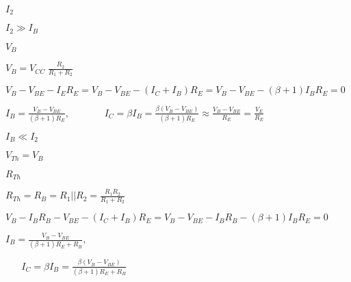 \documentclass{article}
\def\lthtmlcheckvsize{\ifdim\ht\sizebox<\vsize 
  \ifdim\wd\sizebox<\hsize\expandafter\hfill\fi \expandafter\vfill
  \else\expandafter\vss\fi}%
\begin{document}
{\newpage\clearpage
{}%
$ I_2$%
\lthtmlindisplaymathZ
\lthtmlcheckvsize\clearpage}

{\newpage\clearpage
{}%
$ I_2\gg I_B$%
\lthtmlindisplaymathZ
\lthtmlcheckvsize\clearpage}

{\newpage\clearpage
{}%
$ V_B$%
\lthtmlindisplaymathZ
\lthtmlcheckvsize\clearpage}

{\newpage\clearpage
{}%
$\displaystyle V_B = V_{CC} \;\frac{R_2}{R_1+R_2}$%
\lthtmlindisplaymathZ
\lthtmlcheckvsize\clearpage}

{\newpage\clearpage
{}%
$\displaystyle V_B-V_{BE}-I_ER_E=V_B-V_{BE}-(I_C+I_B)R_E=V_B-V_{BE}-(\beta+1)I_BR_E=0$%
\lthtmlindisplaymathZ
\lthtmlcheckvsize\clearpage}

{\newpage\clearpage
{}%
$\displaystyle I_B=\frac{V_B-V_{BE}}{(\beta+1)R_E},\;\;\;\;\;\;\;\;\;\;\;\;\;
I_C=\beta I_B=\frac{\beta(V_B-V_{BE})}{(\beta+1)R_E}
\approx \frac{V_B-V_{BE}}{R_E} =\frac{V_E}{R_E}$%
\lthtmlindisplaymathZ
\lthtmlcheckvsize\clearpage}

{\newpage\clearpage
{}%
$ I_B \ll I_2$%
\lthtmlindisplaymathZ
\lthtmlcheckvsize\clearpage}

{\newpage\clearpage
{}%
$ V_{Th}=V_B$%
\lthtmlindisplaymathZ
\lthtmlcheckvsize\clearpage}

{\newpage\clearpage
{}%
$ R_{Th}$%
\lthtmlindisplaymathZ
\lthtmlcheckvsize\clearpage}

{\newpage\clearpage
{}%
$\displaystyle R_{Th}=R_B=R_1||R_2=\frac{R_1R_2}{R_1+R_2}$%
\lthtmlindisplaymathZ
\lthtmlcheckvsize\clearpage}

{\newpage\clearpage
{}%
$\displaystyle V_B-I_BR_B-V_{BE}-(I_C+I_B)R_E=V_B-V_{BE}-I_BR_B-(\beta+1)I_BR_E=0$%
\lthtmlindisplaymathZ
\lthtmlcheckvsize\clearpage}

{\newpage\clearpage
{}%
$\displaystyle I_B=\frac{V_B-V_{BE}}{(\beta+1) R_E+R_B},\;\;\;\;\;$%
\lthtmlindisplaymathZ
\lthtmlcheckvsize\clearpage}

{\newpage\clearpage
{}%
$\displaystyle \;\;\;\;\;\;
I_C =\beta I_B=\frac{\beta(V_B-V_{BE})}{(\beta+1) R_E+R_B}$%
\lthtmlindisplaymathZ
\lthtmlcheckvsize\clearpage}
\end{document}

